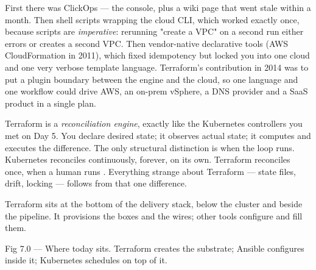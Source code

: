  First there was ClickOps --- the console, plus a wiki page that went stale within a month. Then shell scripts wrapping the cloud CLI, which worked exactly once, because scripts are \emph{imperative}: rerunning "create a VPC" on a second run either errors or creates a second VPC. Then vendor-native declarative tools (AWS CloudFormation in 2011), which fixed idempotency but locked you into one cloud and one very verbose template language. Terraform's contribution in 2014 was to put a plugin boundary between the engine and the cloud, so one language and one workflow could drive AWS, an on-prem vSphere, a DNS provider and a SaaS product in a single plan.

\begin{keyidea}
Terraform is a \emph{reconciliation engine}, exactly like the Kubernetes controllers you met on Day 5. You declare desired state; it observes actual state; it computes and executes the difference. The only structural distinction is when the loop runs. Kubernetes reconciles continuously, forever, on its own. Terraform reconciles once, when a human runs . Everything strange about Terraform --- state files, drift, locking --- follows from that one difference.
\end{keyidea}

 Terraform sits at the bottom of the delivery stack, below the cluster and beside the pipeline. It provisions the boxes and the wires; other tools configure and fill them.

\begin{wbfigure}{Fig 7.0 — Where today sits. Terraform creates the substrate; Ansible configures inside it; Kubernetes schedules on top of it.}
\end{wbfigure}

